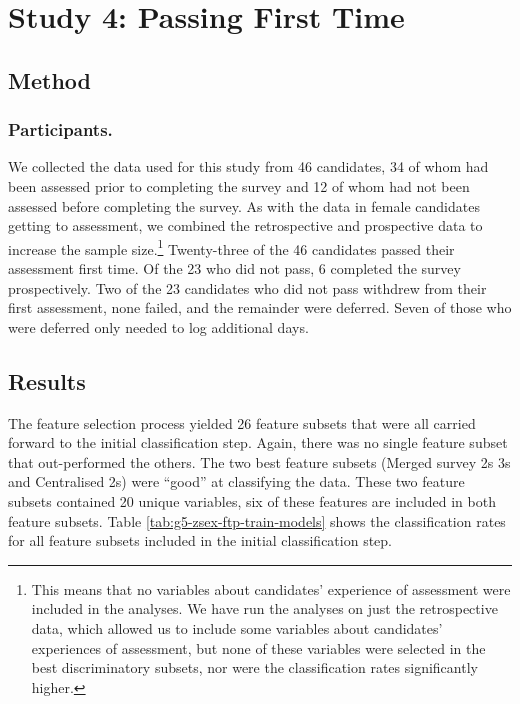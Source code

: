 \documentclass[
  12pt,
  a4paper,
]{book}
\begin{document}
\hypertarget{ftp}{%
\section{Study 4: Passing First Time}\label{ftp}}

\hypertarget{ftp-method}{%
\subsection{Method}\label{ftp-method}}

\hypertarget{ftp-participants}{%
\subsubsection{Participants.}\label{ftp-participants}}

We collected the data used for this study from 46 candidates, 34 of whom had been assessed prior to completing the survey and 12 of whom had not been assessed before completing the survey. As with the data in female candidates getting to assessment, we combined the retrospective and prospective data to increase the sample size.\footnote{This means that no variables about candidates' experience of assessment were included in the analyses. We have run the analyses on just the retrospective data, which allowed us to include some variables about candidates' experiences of assessment, but none of these variables were selected in the best discriminatory subsets, nor were the classification rates significantly higher.} Twenty-three of the 46 candidates passed their assessment first time. Of the 23 who did not pass, 6 completed the survey prospectively. Two of the 23 candidates who did not pass withdrew from their first assessment, none failed, and the remainder were deferred. Seven of those who were deferred only needed to log additional days.

\hypertarget{ftp-results}{%
\subsection{Results}\label{ftp-results}}

The feature selection process yielded 26 feature subsets that were all carried forward to the initial classification step. Again, there was no single feature subset that out-performed the others. The two best feature subsets (Merged survey 2s 3s and Centralised 2s) were ``good'' at classifying the data. These two feature subsets contained 20 unique variables, six of these features are included in both feature subsets. Table \ref{tab:g5-zsex-ftp-train-models} shows the classification rates for all feature subsets included in the initial classification step.
\end{document}
